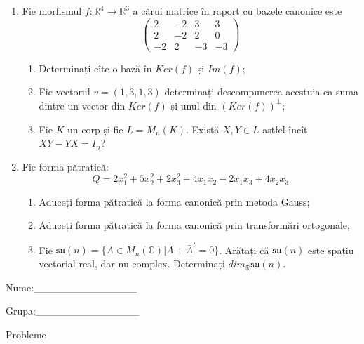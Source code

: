 \documentclass{article}
\begin{document}
\begin{enumerate}
 \item Fie morfismul $f:\mathbb{R}^4 \to \mathbb{R}^3$ a cărui matrice în raport cu bazele canonice este
$$\begin{pmatrix}
2&-2&3&3\\
2&-2&2&0\\
-2&2&-3&-3
\end{pmatrix}$$

\begin{enumerate}
\item Determinați cîte o bază în $Ker(f)$ și $Im(f)$;
\item Fie vectorul $v=(1,3,1,3)$ determinați descompunerea acestuia ca suma dintre un vector din $Ker(f)$ și unul din $(Ker(f))^\perp$;
\item Fie $K$ un corp și fie $L=M_n(K)$. Există $X,Y \in L$ astfel încît $XY-YX=I_n$?  
\end{enumerate}
\item Fie forma pătratică:
$$Q= 2x_1^2+5x_2^2+2x_3^2-4x_1x_2-2x_1x_3+4x_2x_3$$

\begin{enumerate}
\item Aduceți forma pătratică la forma canonică prin metoda Gauss;
\item Aduceți forma pătratică la forma canonică prin transformări ortogonale;
\item Fie $\mathfrak{su}(n)=\{ A \in M_n(\mathbb{C}) | A+\bar{A}^t=0\}$. Arătați că $\mathfrak{su}(n)$ este spațiu vectorial real, dar nu complex.
Determinați $dim_{\mathbb{R}}\mathfrak{su}(n)$.
\end{enumerate}
\end{enumerate}
\newpage
\begin{flushright}
Nume:\_\_\_\_\_\_\_\_\_\_\_\_\_\_
 
 
Grupa:\_\_\_\_\_\_\_\_\_\_\_\_\_\_
\end{flushright}
\begin{center}
\vspace{2cm}
{\Large Probleme}
\vspace{2cm}
\end{center}
\end{document}
